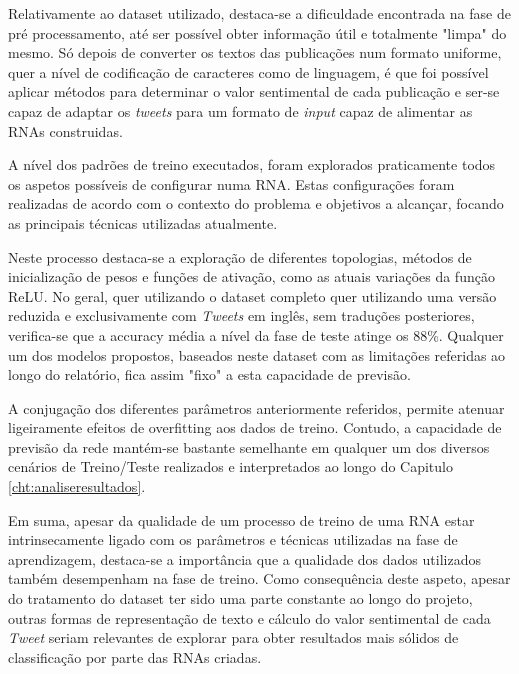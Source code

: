 Relativamente ao dataset utilizado, destaca-se a dificuldade encontrada na fase de pré processamento, até ser possível obter informação útil e totalmente "limpa" do mesmo. 
Só depois de converter os textos das publicações num formato uniforme, quer a nível de codificação de caracteres como de linguagem, é que foi possível aplicar métodos para determinar o valor sentimental de cada publicação e ser-se capaz de adaptar os \textit{tweets} para um formato de \textit{input} capaz de alimentar as RNAs construidas.

A nível dos padrões de treino executados, foram explorados praticamente todos os aspetos possíveis de configurar numa RNA. Estas configurações foram realizadas de acordo com o contexto do problema e objetivos a alcançar, focando as principais técnicas utilizadas atualmente. 

Neste processo destaca-se a exploração de diferentes topologias, métodos de inicialização de pesos e funções de ativação, como as atuais variações da função ReLU. 
No geral, quer utilizando o dataset completo quer utilizando uma versão reduzida e exclusivamente com \textit{Tweets} em inglês, sem traduções posteriores, verifica-se que a accuracy média a nível da fase de teste atinge os 88\%. Qualquer um dos modelos propostos, baseados neste dataset com as limitações referidas ao longo do relatório, fica assim "fixo" a esta capacidade de previsão. 

A conjugação dos diferentes parâmetros anteriormente referidos, permite atenuar ligeiramente efeitos de overfitting aos dados de treino. 
Contudo, a capacidade de previsão da rede mantém-se bastante semelhante em qualquer um dos diversos cenários de Treino/Teste realizados e interpretados ao longo do Capitulo \ref{cht:analiseresultados}. 

Em suma, apesar da qualidade de um processo de treino de uma RNA estar intrinsecamente ligado com os parâmetros e técnicas utilizadas na fase de aprendizagem, destaca-se a importância que a qualidade dos dados utilizados também desempenham na fase de treino. 
Como consequência deste aspeto, apesar do tratamento do dataset ter sido uma parte constante ao longo do projeto, outras formas de representação de texto e cálculo do valor sentimental de cada \textit{Tweet} seriam relevantes de explorar para obter resultados mais sólidos de classificação por parte das RNAs criadas. 

